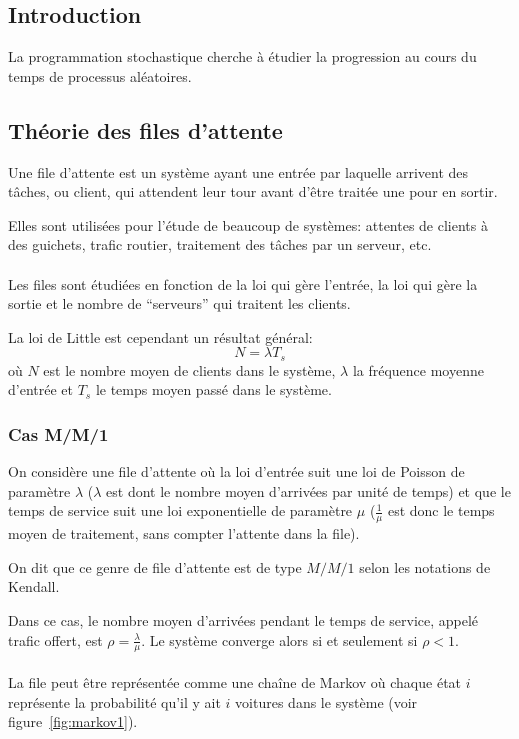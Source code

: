 \subsection{Introduction}
  La programmation stochastique cherche à étudier la progression au cours du
  temps de processus aléatoires.

\subsection{Théorie des files d'attente}
  Une file d'attente est un système ayant une entrée par laquelle arrivent des
  tâches, ou client, qui attendent leur tour avant d'être traitée une pour en
  sortir.

  Elles sont utilisées pour l'étude de beaucoup de systèmes: attentes de
  clients à des guichets, trafic routier, traitement des tâches par un
  serveur, etc.

  \paragraph{}
  Les files sont étudiées en fonction de la loi qui gère l'entrée, la loi qui
  gère la sortie et le nombre de ``serveurs'' qui traitent les clients.

  La loi de Little est cependant un résultat général:
    \[N = \lambda T_s\]
  où $N$ est le nombre moyen de clients dans le système, $\lambda$ la fréquence
  moyenne d'entrée et $T_s$ le temps moyen passé dans le système.

  \subsubsection{Cas M/M/1}
    On considère une file d'attente où la loi d'entrée suit une loi de Poisson
    de paramètre $\lambda$ ($\lambda$ est dont le nombre moyen d'arrivées par
    unité de temps) et que le temps de service suit une loi exponentielle de
    paramètre $\mu$ ($\frac 1 \mu$ est donc le temps moyen de traitement, sans
    compter l'attente dans la file).

    On dit que ce genre de file d'attente est de type $M/M/1$ selon les
    notations de Kendall.

    Dans ce cas, le nombre moyen d'arrivées pendant le temps de service, appelé
    trafic offert, est $\rho = \frac \lambda \mu$. Le système converge alors si
    et seulement si $\rho < 1$.
    
    \paragraph{}
    La file peut être représentée comme une chaîne de Markov où chaque état $i$
    représente la probabilité qu'il y ait $i$ voitures dans le système (voir
    figure~\ref{fig:markov1}).

